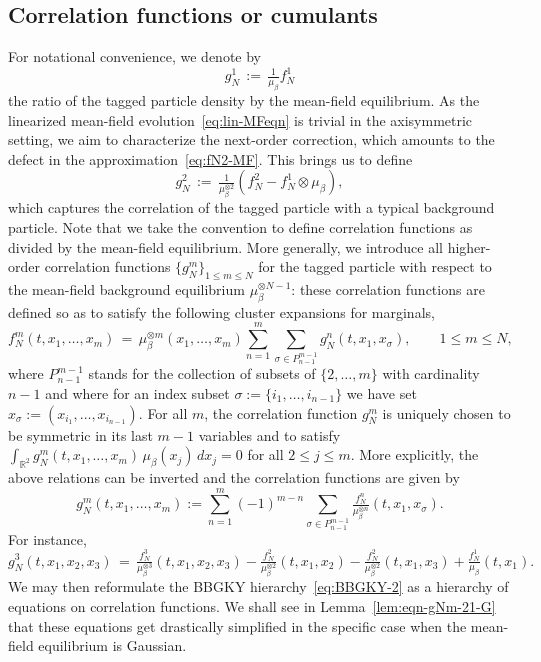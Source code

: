 \documentclass[a4paper,11pt,reqno,noindent]{amsart}
\theoremstyle{plain}
\numberwithin{equation}{section}
\newcommand{\R}{\mathbb R}
\newcommand{\3}{|\!|\!|}
\begin{document}
\subsection{Correlation functions or cumulants}\label{sec:correlations}
For notational convenience, we denote by
\[g_N^1\,:=\,\tfrac1{\mu_\beta}f_N^1\]
the ratio of the tagged particle density by the mean-field equilibrium.
As the linearized mean-field evolution~\eqref{eq:lin-MFeqn} is trivial in the axisymmetric setting,
we aim to characterize the next-order correction, which amounts to the defect in the approximation~\eqref{eq:fN2-MF}.
This brings us to define
\[g_N^2\,:=\,\tfrac1{\mu_\beta^{\otimes2}}(f_N^2-f_N^1\otimes\mu_\beta),\]
which captures the correlation of the tagged particle with a typical background particle. Note that we take the convention to define correlation functions as divided by the mean-field equilibrium.
More generally, we introduce all higher-order correlation functions $\{g_N^m\}_{1\le m\le N}$ for the tagged particle with respect to the mean-field background equilibrium $\mu_\beta^{\otimes N-1}$:
these correlation functions are defined so as to satisfy the following cluster expansions for marginals,
\begin{equation}\label{eq:correl-def-clust-2}
f_N^m(t,x_1,\ldots,x_m)\,=\,\mu_\beta^{\otimes m}(x_1,\ldots,x_m)\sum_{n=1}^m\sum_{\sigma\in P_{n-1}^{m-1}}g_N^n(t,x_1,x_\sigma),\qquad1\le m\le N,
\end{equation}
where $P_{n-1}^{m-1}$ stands for the collection of subsets of $\{2,\ldots,m\}$ with cardinality $n-1$ and where for an index subset $\sigma:=\{i_1,\ldots,i_{n-1}\}$ we have set $x_\sigma:=(x_{i_1},\ldots,x_{i_{n-1}})$.
For all $m$, the correlation function $g_N^m$ is uniquely chosen to be symmetric in its last $m-1$ variables and to satisfy $\int_{\R^2}g_N^m(t,x_1,\ldots,x_m)\,\mu_\beta(x_j)\,dx_j=0$ for all $2\le j\le m$.
More explicitly, the above relations can be inverted and the correlation functions are given by
\begin{equation}\label{eq:correl-def-2}
g_N^m(t,x_1,\ldots,x_m):=\sum_{n=1}^m(-1)^{m-n}\sum_{\sigma\in P_{n-1}^{m-1}}\tfrac{f_N^{n}}{\mu_\beta^{\otimes n}}(t,x_1,x_\sigma).
\end{equation}
For instance,
\begin{equation*}
g_N^3(t,x_1,x_2,x_3)\,=\,\tfrac{f_N^3}{\mu_\beta^{\otimes3}}(t,x_1,x_2,x_3)-\tfrac{f_N^2}{\mu_\beta^{\otimes2}}(t,x_1,x_2)-\tfrac{f_N^2}{\mu_\beta^{\otimes2}}(t,x_1,x_3)+\tfrac{f_N^1}{\mu_\beta}(t,x_1).
\end{equation*}
We may then reformulate the BBGKY hierarchy~\eqref{eq:BBGKY-2} as a hierarchy of equations on correlation functions.
We shall see in Lemma~\ref{lem:eqn-gNm-21-G} that these equations get drastically simplified in the specific case when the mean-field equilibrium is Gaussian.
\end{document}
